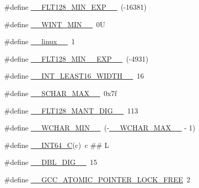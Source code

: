 \begin{DoxyCompactItemize}
\item 
\#define \hyperlink{cmake-build-debug_2babel__client__autogen_2moc__predefs_8h_aad2e8f7e8d06ab966a1210f4a7d65770}{\+\_\+\+\_\+\+F\+L\+T128\+\_\+\+M\+I\+N\+\_\+\+E\+X\+P\+\_\+\+\_\+}~(-\/16381)
\item 
\#define \hyperlink{cmake-build-debug_2babel__client__autogen_2moc__predefs_8h_a135696718aa5b38e58be73aaece6654f}{\+\_\+\+\_\+\+W\+I\+N\+T\+\_\+\+M\+I\+N\+\_\+\+\_\+}~0U
\item 
\#define \hyperlink{cmake-build-debug_2babel__client__autogen_2moc__predefs_8h_a1b27e3508a4c1e97875297882a95f503}{\+\_\+\+\_\+linux\+\_\+\+\_\+}~1
\item 
\#define \hyperlink{cmake-build-debug_2babel__client__autogen_2moc__predefs_8h_a784d5a4b7494076d83772a819916b039}{\+\_\+\+\_\+\+F\+L\+T128\+\_\+\+M\+I\+N\+\_\+\_\+\+E\+X\+P\+\_\+\+\_\+}~(-\/4931)
\item 
\#define \hyperlink{cmake-build-debug_2babel__client__autogen_2moc__predefs_8h_a6091ba87f9a538a9685b7997a64a64db}{\+\_\+\+\_\+\+I\+N\+T\+\_\+\+L\+E\+A\+S\+T16\+\_\+\+W\+I\+D\+T\+H\+\_\+\+\_\+}~16
\item 
\#define \hyperlink{cmake-build-debug_2babel__client__autogen_2moc__predefs_8h_a87b7ceac2198cab045e40c9a64b11679}{\+\_\+\+\_\+\+S\+C\+H\+A\+R\+\_\+\+M\+A\+X\+\_\+\+\_\+}~0x7f
\item 
\#define \hyperlink{cmake-build-debug_2babel__client__autogen_2moc__predefs_8h_a39e5016b6c2adbc3a6b1674c458d4dc5}{\+\_\+\+\_\+\+F\+L\+T128\+\_\+\+M\+A\+N\+T\+\_\+\+D\+I\+G\+\_\+\+\_\+}~113
\item 
\#define \hyperlink{cmake-build-debug_2babel__client__autogen_2moc__predefs_8h_a01b915d3ec5439de746f1d5e9f76dc3d}{\+\_\+\+\_\+\+W\+C\+H\+A\+R\+\_\+\+M\+I\+N\+\_\+\+\_\+}~(-\/\hyperlink{cmake-build-debug_2babel__client__autogen_2moc__predefs_8h_a65ac8cd0434319a3a31dc031409c218a}{\+\_\+\+\_\+\+W\+C\+H\+A\+R\+\_\+\+M\+A\+X\+\_\+\+\_\+} -\/ 1)
\item 
\#define \hyperlink{cmake-build-debug_2babel__client__autogen_2moc__predefs_8h_a4b8971e411b88166747d2a3c2425eaee}{\+\_\+\+\_\+\+I\+N\+T64\+\_\+C}(c)~c \#\# L
\item 
\#define \hyperlink{cmake-build-debug_2babel__client__autogen_2moc__predefs_8h_a61969667ef3b668024a20df9bc34c991}{\+\_\+\+\_\+\+D\+B\+L\+\_\+\+D\+I\+G\+\_\+\+\_\+}~15
\item 
\#define \hyperlink{cmake-build-debug_2babel__client__autogen_2moc__predefs_8h_aa808bc3159395526ac0c07d36b87dec1}{\+\_\+\+\_\+\+G\+C\+C\+\_\+\+A\+T\+O\+M\+I\+C\+\_\+\+P\+O\+I\+N\+T\+E\+R\+\_\+\+L\+O\+C\+K\+\_\+\+F\+R\+EE}~2

\end{DoxyCompactItemize}
